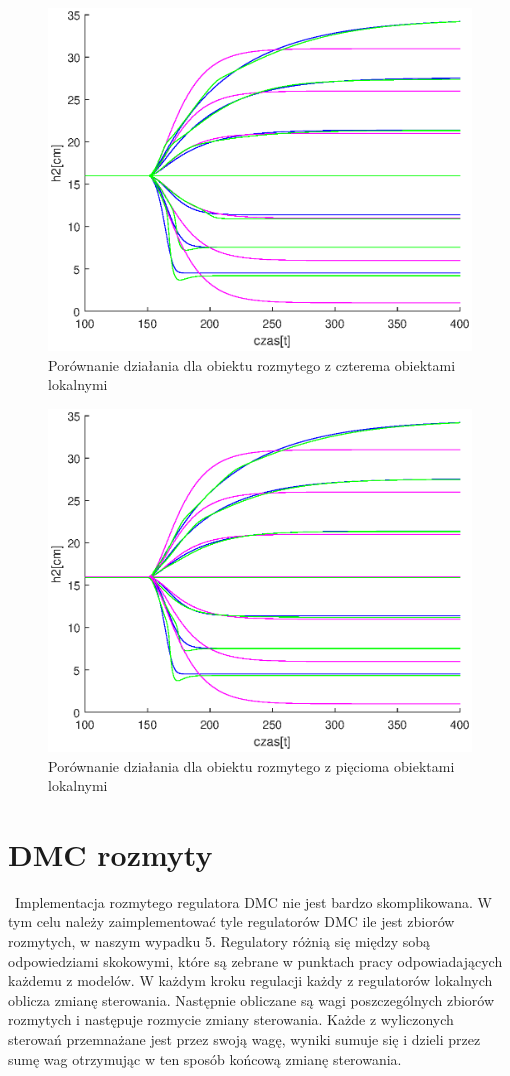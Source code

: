 		\begin{figure}[h!]
			\includegraphics[width=0.9\linewidth]{plots/z2_modelroz_4p.eps}
			\caption{Porównanie działania dla obiektu rozmytego z czterema obiektami lokalnymi}
			\label{rys:roz4p}
		\end{figure}
		\begin{figure}[h!]
			\includegraphics[width=0.9\linewidth]{plots/z2_modelroz_5p.eps}
			\caption{Porównanie działania dla obiektu rozmytego z pięcioma obiektami lokalnymi}
			\label{rys:roz5p}
		\end{figure}
	\newpage
	\section{DMC rozmyty}\
		Implementacja rozmytego regulatora DMC nie jest bardzo skomplikowana. W tym celu należy zaimplementować tyle regulatorów DMC ile jest zbiorów rozmytych, w naszym wypadku 5. Regulatory różnią się między sobą odpowiedziami skokowymi, które są zebrane w punktach pracy odpowiadających każdemu z modelów. W każdym kroku regulacji każdy z regulatorów lokalnych oblicza zmianę sterowania. Następnie obliczane są wagi poszczególnych zbiorów rozmytych i następuje rozmycie zmiany sterowania. Każde z wyliczonych sterowań przemnażane jest przez swoją wagę, wyniki sumuje się i dzieli przez sumę wag otrzymując w ten sposób końcową zmianę sterowania.
		
